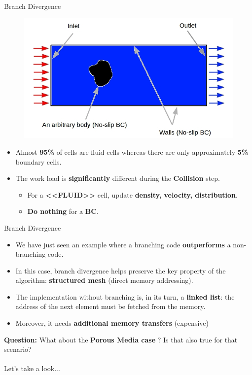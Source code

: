 \documentclass[9pt]{beamer}
\newcommand{\emphasize}[1]{\textbf{\color{red} #1 } }
\begin{document}
\begin{frame}[t]{Branch Divergence }
\begin{figure}
	\includegraphics[scale=0.3]{images/wind-tunnel-1.jpg}
	\centering
\end{figure}

\begin{itemize}
\item Almost \textbf{95\%} of cells are fluid cells whereas there are only approximately \textbf{5\%} boundary cells.

\item The work load is \textbf{significantly} different during the \textbf{Collision} step.
	\begin{itemize}
	\item For a \textbf{<<FLUID>>} cell, update \textbf{density, velocity, distribution}.
	\item \textbf{Do nothing} for a \textbf{BC}. 
	\end{itemize}
\end{itemize}
\end{frame}

\begin{frame}[t]{Branch Divergence}
\begin{itemize}
\item We have just seen an example where a branching code \textbf{outperforms} a non-branching code. 

\item In this case, branch divergence helps preserve the key property of the algorithm: \textbf{structured mesh} (direct memory addressing).

\item The implementation without branching is, in its turn, a \textbf{linked list}: the address of the next element must be fetched from the memory.

\item Moreover, it needs \textbf{additional memory transfers} (expensive)
\end{itemize}

\textbf{Question:} What about the \emphasize{Porous Media case}? Is that also true for that scenario? 
\\~\\
Let's take a look...
\end{frame}
\end{document}
